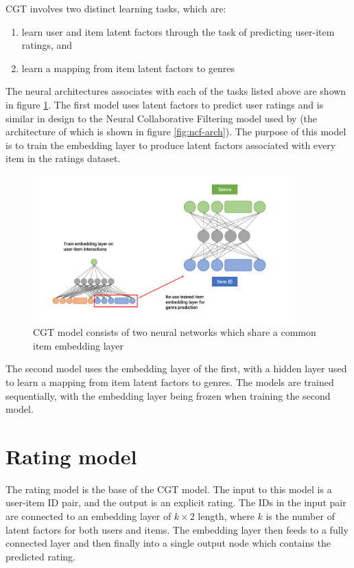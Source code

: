 CGT involves two distinct learning tasks, which are:
\begin{enumerate}
    \item learn user and item latent factors through the task of predicting user-item ratings, and
    \item learn a mapping from item latent factors to genres
\end{enumerate}
The neural architectures associates with each of the tasks listed above are shown in figure \ref{fig:4_CGT-architecture}. The first model uses latent factors to predict user ratings and is similar in design to the Neural Collaborative Filtering model used by \citeauthor{he2017neural} (the architecture of which is shown in figure \ref{fig:ncf-arch}). The purpose of this model is to train the embedding layer to produce latent factors associated with every item in the ratings dataset.

\begin{figure}[H]
\centering
\includegraphics[width=0.9\textwidth]{Figures/4_CGT-model.pdf}
\decoRule
\caption[CGT architecture]{CGT model consists of two neural networks which share a common item embedding layer}
\label{fig:4_CGT-architecture}
\end{figure}

The second model uses the embedding layer of the first, with a hidden layer used to learn a mapping from item latent factors to genres. The models are trained sequentially, with the embedding layer being frozen when training the second model.

\section{Rating model}
\label{section:rating-model}
The rating model is the base of the CGT model. The input to this model is a user-item ID pair, and the output is an explicit rating. The IDs in the input pair are connected to an embedding layer of $k\times2$ length, where $k$ is the number of latent factors for both users and items. The embedding layer then feeds to a fully connected layer and then finally into a single output node which contains the predicted rating.

